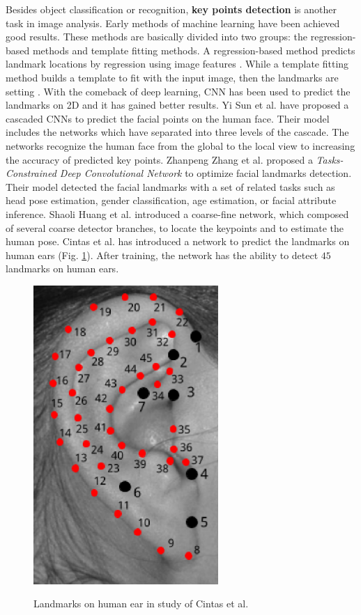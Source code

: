 \documentclass[review]{elsarticle}
\begin{document}
Besides object classification or recognition, \textbf{key points detection} is another task in image analysis. Early methods of machine learning have been achieved good results. These methods are basically divided into two groups: the regression-based methods and template fitting methods. A regression-based method predicts landmark locations by regression using image features \cite{valstar2010facial,dantone2012real,burgos2013robust}. While a template fitting method builds a template to fit with the input image, then the landmarks are setting \cite{cootes2001active,liu2007generic,yu2013pose}. With the comeback of deep learning, CNN has been used to predict the landmarks on 2D and it has gained better results. Yi Sun et al. \cite{sun2013deep} have proposed a cascaded CNNs to predict the facial points on the human face. Their model includes the networks which have separated into three levels of the cascade. The networks recognize the human face from the global to the local view to increasing the accuracy of predicted key points. Zhanpeng Zhang et al. \cite{zhang2014facial} proposed a \textit{Tasks-Constrained Deep Convolutional Network} to optimize facial landmarks detection. Their model detected the facial landmarks with a set of related tasks such as head pose estimation, gender classification, age estimation, or facial attribute inference. Shaoli Huang et al. \cite{huang2017coarse} introduced a coarse-fine network, which composed of several coarse detector branches, to locate the keypoints and to estimate the human pose. Cintas et al. \cite{cintas2016automatic} has introduced a network to predict the landmarks on human ears (Fig. \ref{imgears}). After training, the network has the ability to detect $45$ landmarks on human ears. 

\begin{figure}[!h]
	\centering
	\includegraphics[scale=.4]{images/ear_landmarks}	\
	\caption{Landmarks on human ear in study of Cintas et al. \cite{cintas2016automatic}}
	\label{imgears}
\end{figure}
\end{document}
